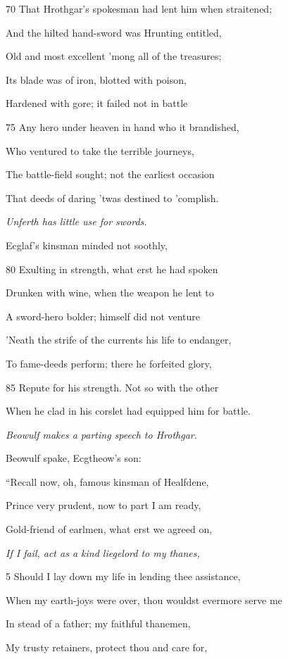 70
That Hrothgar’s spokesman had lent him when straitened;

And the hilted hand-sword was Hrunting entitled,

Old and most excellent ’mong all of the treasures;

Its blade was of iron, blotted with poison,

Hardened with gore; it failed not in battle

75
Any hero under heaven in hand who it brandished,

Who ventured to take the terrible journeys,

The battle-field sought; not the earliest occasion

That deeds of daring ’twas destined to ’complish.

\emph{Unferth has little
use for swords.}

Ecglaf’s kinsman minded not soothly,

80
Exulting in strength, what erst he had spoken

Drunken with wine, when the weapon he lent to

A sword-hero bolder; himself did not venture

’Neath the strife of the currents his life to endanger,

To fame-deeds perform; there he forfeited glory,

85
Repute for his strength. Not so with the other

When he clad in his corslet had equipped him for battle.



\emph{Beowulf makes a
parting speech to
Hrothgar.}

Beowulf spake, Ecgtheow’s son:

“Recall now, oh, famous kinsman of Healfdene,

Prince very prudent, now to part I am ready,

Gold-friend of earlmen, what erst we agreed on,

\emph{If I fail, act as a
kind liegelord to
my thanes,}

5
Should I lay down my life in lending thee assistance,

When my earth-joys were over, thou wouldst evermore serve me

In stead of a father; my faithful thanemen,

My trusty retainers, protect thou and care for,

